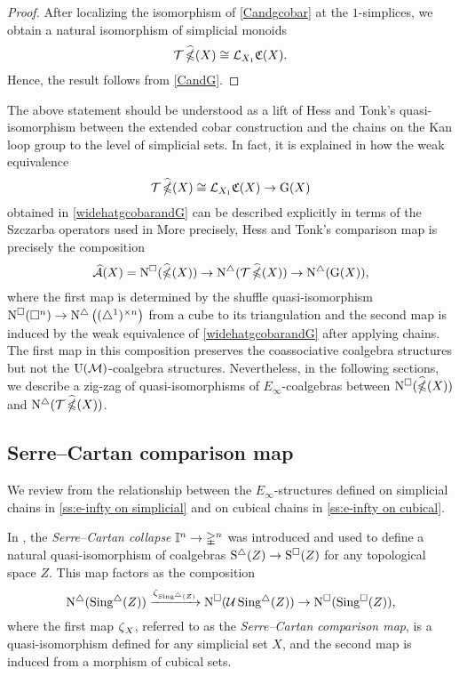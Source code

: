 \begin{proof}
	After localizing the isomorphism of \cref{Candgcobar} at the $1$-simplices, we obtain a natural isomorphism of simplicial monoids
	\[
	\mathcal{T} \operatorname{\widehat{\mathbb{\Omega}}}(X) \cong \operatorname{\mathcal{L}}_{X_1} \! \operatorname{\mathfrak{C}}(X).
	\]
	Hence, the result follows from \cref{CandG}.
\end{proof}

 The above statement should be understood as a lift of Hess and Tonk's quasi-isomorphism between the extended cobar construction and the chains on the Kan loop group to the level of simplicial sets.
In fact, it is explained in \cite{minichello2021path} how the weak equivalence
\[
\mathcal{T} \operatorname{\widehat{\mathbb{\Omega}}}(X) \cong \mathcal{L}_{X_1} \! \operatorname{\mathfrak{C}}(X) \to \operatorname{G}(X)
\]
obtained in \cref{widehatgcobarandG}
 can be described explicitly in terms of the Szczarba operators used in \cite{hess2010cobar}
More precisely, Hess and Tonk's comparison map is precisely the composition
\[
\operatorname{\mathcal{\widehat{A}}}(X) = \operatorname{N^{\square}}(\operatorname{\widehat{\mathbb{\Omega}}}(X)) \to \operatorname{N^{\triangle}}(\mathcal{T}\operatorname{\widehat{\mathbb{\Omega}}}(X)) \to \operatorname{N^{\triangle}} (\operatorname{G}(X)),
\]
where the first map is determined by the shuffle quasi-isomorphism
$\operatorname{N^{\square}}(\square^n)\to \operatorname{N^{\triangle}} \big( (\triangle^1)^{\times n} \big)$ from a cube to its triangulation and the second map is induced by the weak equivalence of \cref{widehatgcobarandG} after applying chains.
The first map in this composition preserves the coassociative coalgebra structures but not the ${\operatorname{U}(\mathcal{M})}$-coalgebra structures.
Nevertheless, in the following sections, we describe a zig-zag of quasi-isomorphisms of $E_{\infty}$-coalgebras between $\operatorname{N^{\square}}(\operatorname{\widehat{\mathbb{\Omega}}}(X))$ and $\operatorname{N^{\triangle}}(\mathcal{T}\operatorname{\widehat{\mathbb{\Omega}}}(X))$.

\subsection{Serre--Cartan comparison map}

We review from \cite{medina2021cubical} the relationship between the $E_\infty$-structures defined on simplicial chains in \cref{ss:e-infty on simplicial} and on cubical chains in \cref{ss:e-infty on cubical}.

In \cite[p.442]{serre1951homologie}, the \textit{Serre--Cartan collapse} $\mathbb{I}^n \to \mathbb{\Delta}^n$ was introduced and used to define a natural quasi-isomorphism of coalgebras $\operatorname{S^{\triangle}}(Z) \to \operatorname{S^{\square}}(Z)$ for any topological space $Z$.
This map factors as the composition
\[
\operatorname{N^{\triangle}}(\operatorname{Sing^{\triangle}}(Z)) \xrightarrow{\operatorname{\zeta}_{\operatorname{Sing^{\triangle}}(Z)}}
\operatorname{N^{\square}}(\mathcal{U} \operatorname{Sing^{\triangle}}(Z)) \to
\operatorname{N^{\square}}(\operatorname{Sing^{\square}}(Z)),
\]
where the first map $\operatorname{\zeta}_X$, referred to as the \textit{Serre--Cartan comparison map}, is a quasi-isomorphism defined for any simplicial set $X$, and the second map is induced from a morphism of cubical sets.

